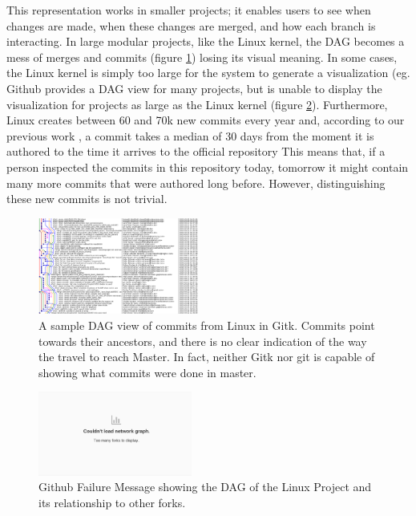 \documentclass[conference, draftclsnofoot, draft]{IEEEtran}
\begin{document}
This representation works in smaller projects; it enables users to see
when changes are made, when these changes are merged, and how each branch is
interacting.  
In large modular projects, like the Linux kernel, the DAG becomes a
mess of merges and commits (figure \ref{fig:gitk}) losing its visual meaning.  In
some cases, the Linux kernel is simply too large for the system to generate a
visualization (eg. Github provides a DAG view for many projects, but is unable to
display the visualization for projects as large as the Linux kernel (figure
\ref{fig:gitfail}).
Furthermore, Linux creates between 60 and 70k new commits every year and, according to our previous work \cite{German2015}, 
a commit takes a median of 30 days from the moment it is authored to the time it arrives to the official repository
This means that, if a person inspected the commits in this repository today, tomorrow it might contain  many more
commits that were authored long before. However, distinguishing these new commits is not trivial. 

\begin{figure}
        \centering
        \includegraphics[width=0.47\textwidth]{figures/gitk.png}
        \caption{A sample DAG view of commits from Linux in Gitk. Commits point towards their ancestors, and there is no clear indication of the way the travel
                to reach Master. In fact, neither Gitk nor git is capable of showing what commits were done in master.}
        \label{fig:gitk}
\end{figure}

\begin{figure}
        \centering
        \includegraphics[width=0.45\textwidth]{figures/github_viewer.png}
        \caption{Github Failure Message showing the DAG of the Linux Project and its relationship to other forks.}
        \label{fig:gitfail}
\end{figure}
\end{document}
